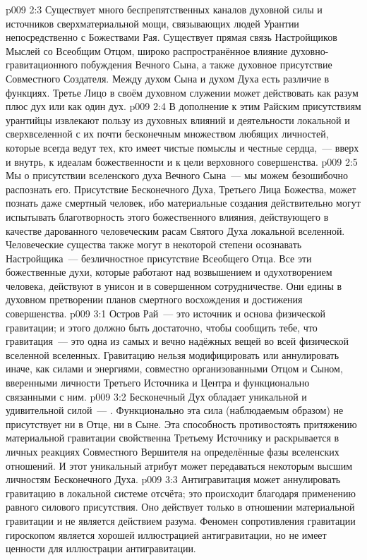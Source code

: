 \vs p009 2:3 Существует много беспрепятственных каналов духовной силы и источников сверхматериальной мощи, связывающих людей Урантии непосредственно с Божествами Рая. Существует прямая связь Настройщиков Мыслей со Всеобщим Отцом, широко распространённое влияние духовно\hyp{}гравитационного побуждения Вечного Сына, а также духовное присутствие Совместного Создателя. Между духом Сына и духом Духа есть различие в функциях. Третье Лицо в своём духовном служении может действовать как разум плюс дух или как один дух.
\vs p009 2:4 В дополнение к этим Райским присутствиям урантийцы извлекают пользу из духовных влияний и деятельности локальной и сверхвселенной с их почти бесконечным множеством любящих личностей, которые всегда ведут тех, кто имеет чистые помыслы и честные сердца,~--- вверх и внутрь, к идеалам божественности и к цели верховного совершенства.
\vs p009 2:5 Мы  о присутствии вселенского духа Вечного Сына~--- мы можем безошибочно распознать его. Присутствие Бесконечного Духа, Третьего Лица Божества, может познать даже смертный человек, ибо материальные создания действительно могут испытывать благотворность этого божественного влияния, действующего в качестве дарованного человеческим расам Святого Духа локальной вселенной. Человеческие существа также могут в некоторой степени осознавать Настройщика~--- безличностное присутствие Всеобщего Отца. Все эти божественные духи, которые работают над возвышением и одухотворением человека, действуют в унисон и в совершенном сотрудничестве. Они едины в духовном претворении планов смертного восхождения и достижения совершенства.
\vs p009 3:1 Остров Рай~--- это источник и основа физической гравитации; и этого должно быть достаточно, чтобы сообщить тебе, что гравитация~--- это одна из самых  и вечно надёжных вещей во всей физической вселенной вселенных. Гравитацию нельзя модифицировать или аннулировать иначе, как силами и энергиями, совместно организованными Отцом и Сыном, вверенными личности Третьего Источника и Центра и функционально связанными с ним.
\vs p009 3:2 \pc Бесконечный Дух обладает уникальной и удивительной силой~--- . Функционально эта сила (наблюдаемым образом) не присутствует ни в Отце, ни в Сыне. Эта способность противостоять притяжению материальной гравитации свойственна Третьему Источнику и раскрывается в личных реакциях Совместного Вершителя на определённые фазы вселенских отношений. И этот уникальный атрибут может передаваться некоторым высшим личностям Бесконечного Духа.
\vs p009 3:3 \pc Антигравитация может аннулировать гравитацию в локальной системе отсчёта; это происходит благодаря применению равного силового присутствия. Оно действует только в отношении материальной гравитации и не является действием разума. Феномен сопротивления гравитации гироскопом является хорошей иллюстрацией  антигравитации, но не имеет ценности для иллюстрации  антигравитации.
